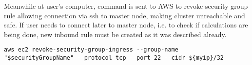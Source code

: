 \documentclass[11pt,english]{article}
\begin{document}
Meanwhile at user's computer, command is sent to AWS to revoke security group rule allowing connection via ssh to master node, making cluster unreachable and safe. If user needs to connect later to master node, i.e. to check if calculations are being done, new inbound rule must be created as it was described already.
\begin{lstlisting}
aws ec2 revoke-security-group-ingress --group-name "$securityGroupName" --protocol tcp --port 22 --cidr ${myip}/32
\end{lstlisting}
\end{document}
